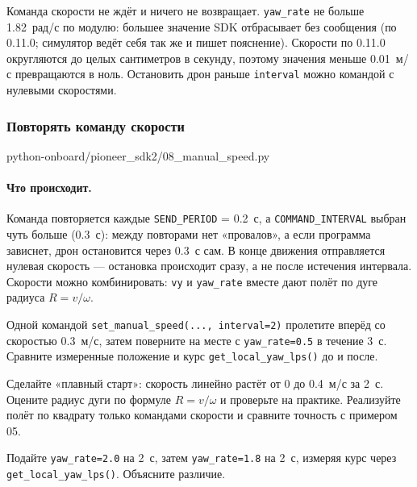 Команда скорости не ждёт и ничего не возвращает. \verb|yaw_rate| не больше 1.82~рад/с по модулю: большее значение SDK отбрасывает без сообщения (по 0.11.0; симулятор ведёт себя так же и пишет пояснение). Скорости по 0.11.0 округляются до целых сантиметров в секунду, поэтому значения меньше 0.01~м/с превращаются в ноль. Остановить дрон раньше \verb|interval| можно командой с нулевыми скоростями.

\subsubsection*{Повторять команду скорости}

\begin{codefile}[python]{python-onboard/pioneer_sdk2/08_manual_speed.py}
\end{codefile}

\paragraph{Что происходит.} Команда повторяется каждые \verb|SEND_PERIOD| = 0.2~с, а \verb|COMMAND_INTERVAL| выбран чуть больше (0.3~с): между повторами нет «провалов», а если программа зависнет, дрон остановится через 0.3~с сам. В конце движения отправляется нулевая скорость --- остановка происходит сразу, а не после истечения интервала. Скорости можно комбинировать: \verb|vy| и \verb|yaw_rate| вместе дают полёт по дуге радиуса $R = v/\omega$.

\begin{taskbox}
Одной командой \verb|set_manual_speed(..., interval=2)| пролетите вперёд со скоростью 0.3~м/с, затем поверните на месте с \verb|yaw_rate=0.5| в течение 3~с. Сравните измеренные положение и курс \verb|get_local_yaw_lps()| до и после.
\end{taskbox}

\begin{taskbox}
Сделайте «плавный старт»: скорость линейно растёт от 0 до 0.4~м/с за 2~с. Оцените радиус дуги по формуле $R = v/\omega$ и проверьте на практике. Реализуйте полёт по квадрату только командами скорости и сравните точность с примером 05.
\end{taskbox}

\begin{taskbox}
Подайте \verb|yaw_rate=2.0| на 2~с, затем \verb|yaw_rate=1.8| на 2~с, измеряя курс через \verb|get_local_yaw_lps()|. Объясните различие.
\end{taskbox}
